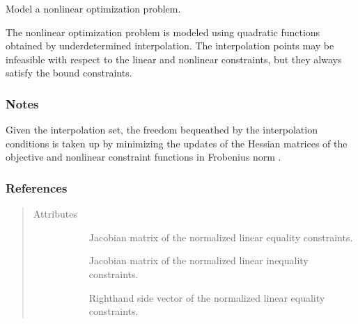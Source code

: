 \documentclass[letterpaper,10pt,english]{sphinxmanual}
\begin{document}
\begin{fulllineitems}
\label{\detokenize{refs/generated/cobyqa.optimize.Models:cobyqa.optimize.Models}}
\sphinxAtStartPar
Model a nonlinear optimization problem.

\sphinxAtStartPar
The nonlinear optimization problem is modeled using quadratic functions
obtained by underdetermined interpolation. The interpolation points may be
infeasible with respect to the linear and nonlinear constraints, but they
always satisfy the bound constraints.
\subsubsection*{Notes}

\sphinxAtStartPar
Given the interpolation set, the freedom bequeathed by the interpolation
conditions is taken up by minimizing the updates of the Hessian matrices of
the objective and nonlinear constraint functions in Frobenius norm
.
\subsubsection*{References}

\sphinxAtStartPar
{}
\begin{quote}\begin{description}
\item[{Attributes}] \leavevmode\begin{description}
\item[{}] \leavevmode
\sphinxAtStartPar
Jacobian matrix of the normalized linear equality constraints.

\item[{}] \leavevmode
\sphinxAtStartPar
Jacobian matrix of the normalized linear inequality constraints.

\item[{}] \leavevmode
\sphinxAtStartPar
Right\sphinxhyphen{}hand side vector of the normalized linear equality constraints.


\end{description}
\end{description}
\end{quote}
\end{fulllineitems}
\end{document}
